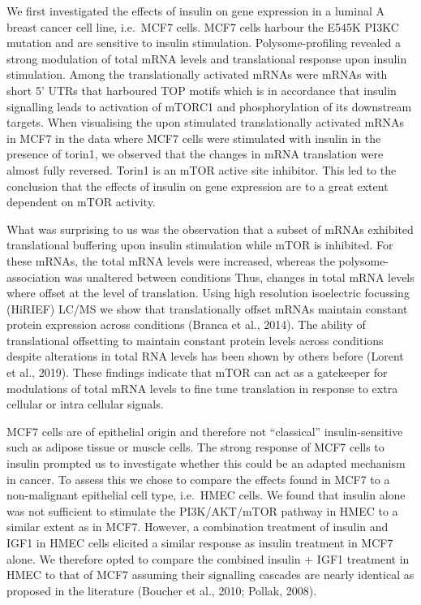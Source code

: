 \documentclass[
  12pt,
  openany]{book}
\begin{document}
We first investigated the effects of insulin on gene expression in a luminal A breast cancer cell line, i.e.~MCF7 cells. MCF7 cells harbour the E545K PI3KC mutation and are sensitive to insulin stimulation. Polysome-profiling revealed a strong modulation of total mRNA levels and translational response upon insulin stimulation. Among the translationally activated mRNAs were mRNAs with short 5' UTRs that harboured TOP motifs which is in accordance that insulin signalling leads to activation of mTORC1 and phosphorylation of its downstream targets. When visualising the upon stimulated translationally activated mRNAs in MCF7 in the data where MCF7 cells were stimulated with insulin in the presence of torin1, we observed that the changes in mRNA translation were almost fully reversed. Torin1 is an mTOR active site inhibitor. This led to the conclusion that the effects of insulin on gene expression are to a great extent dependent on mTOR activity.

What was surprising to us was the observation that a subset of mRNAs exhibited translational buffering upon insulin stimulation while mTOR is inhibited. For these mRNAs, the total mRNA levels were increased, whereas the polysome-association was unaltered between conditions Thus, changes in total mRNA levels where offset at the level of translation. Using high resolution isoelectric focussing (HiRIEF) LC/MS we show that translationally offset mRNAs maintain constant protein expression across conditions (Branca et al., 2014). The ability of translational offsetting to maintain constant protein levels across conditions despite alterations in total RNA levels has been shown by others before (Lorent et al., 2019). These findings indicate that mTOR can act as a gatekeeper for modulations of total mRNA levels to fine tune translation in response to extra cellular or intra cellular signals.

MCF7 cells are of epithelial origin and therefore not ``classical'' insulin-sensitive such as adipose tissue or muscle cells. The strong response of MCF7 cells to insulin prompted us to investigate whether this could be an adapted mechanism in cancer. To assess this we chose to compare the effects found in MCF7 to a non-malignant epithelial cell type, i.e.~HMEC cells. We found that insulin alone was not sufficient to stimulate the PI3K/AKT/mTOR pathway in HMEC to a similar extent as in MCF7. However, a combination treatment of insulin and IGF1 in HMEC cells elicited a similar response as insulin treatment in MCF7 alone. We therefore opted to compare the combined insulin + IGF1 treatment in HMEC to that of MCF7 assuming their signalling cascades are nearly identical as proposed in the literature (Boucher et al., 2010; Pollak, 2008).
\end{document}
